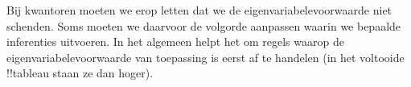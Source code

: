 \documentclass[openany]{memoir}
\begin{document}
\begingroup
\def\olfilename{OLP-0104}
\def\olfilepath{content/first-order-logic/tableaux/}
\hypertarget{unit-OLP-0104}{}





\begin{ex}
Bij kwantoren moeten we erop letten dat we de eigenvariabelevoorwaarde
niet schenden. Soms moeten we daarvoor de volgorde aanpassen waarin we
bepaalde inferenties uitvoeren. In het algemeen helpt het om regels
waarop de eigenvariabelevoorwaarde van toepassing is eerst af te
handelen (in het voltooide !!{tableau} staan ze dan hoger).


\end{ex}
\end{document}

